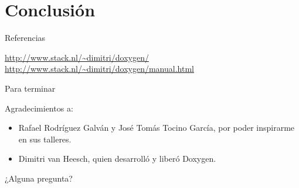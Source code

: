 \documentclass[12pt,xcolor=svgnames]{beamer}
\begin{document}
\section{Conclusión}

\begin{frame}{Referencias}
  \scriptsize
  \begin{thebibliography}{6}
  \bibitem{} \url{http://www.stack.nl/~dimitri/doxygen/}
  \bibitem{} \url{http://www.stack.nl/~dimitri/doxygen/manual.html}
  \end{thebibliography}
\end{frame}

\begin{frame}{Para terminar}

  Agradecimientos a:
  \begin{itemize}
  \item Rafael Rodríguez Galván y José Tomás Tocino García, por poder
    inspirarme en sus talleres.
  \item Dimitri van Heesch, quien desarrolló y liberó Doxygen.
  \end{itemize}
  \vspace*{1cm}
  \begin{center}
    {\Large ¿Alguna pregunta?}
  \end{center}
\end{frame}

\licencia
\end{document}

